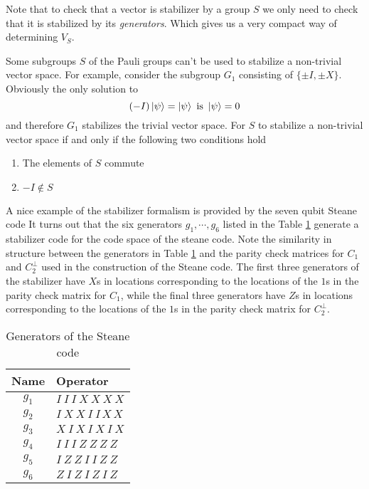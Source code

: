 \documentclass[11pt,a4paper]{article}
\theoremstyle{definition}
\theoremstyle{plain}
\theoremstyle{remark}
\begin{document}
Note that to check that a vector is stabilizer by a group $S$ we only need to check that 
it is stabilized by its \emph{generators}. Which gives us a very compact way of determining $V_S$. 

Some subgroups $S$ of the Pauli groups can't be used to stabilize a non-trivial vector space. 
For example, consider the subgroup $G_1$ consisting of $\{\pm I, \pm X\}$. Obviously the only solution to 
$$(-I) \ket{\psi} = \ket{\psi} \text{ is } \ket{\psi} = 0$$
and therefore $G_1$ stabilizes the trivial vector space. For $S$ to stabilize a 
non-trivial vector space if and only if the following two conditions hold
\begin{enumerate}[label = (\alph*)]
    \item The elements of $S$ commute
    \item $-I \not\in S$ 
\end{enumerate}

A nice example of the stabilizer formalism is provided by the seven qubit Steane code 
It turns out that the six generators $g_1, \cdots, g_6$ listed in the Table \ref{tab:generators-Steane} generate a stabilizer code for 
the code space of the steane code. Note the similarity in structure between the generators in Table \ref{tab:generators-Steane} and the 
parity check matrices for $C_1$ and $C_2^\perp$ used in the construction of the Steane code. 
The first three generators of the stabilizer have $X$s in locations corresponding to the locations of the $1$s in the parity 
check matrix for $ C_1$, while the final three generators have $Z$s in locations corresponding to the locations 
of the $1$s in the parity check matrix for $C_2^\perp$.  

\begin{table}[ht]
  \centering
  \begin{tabular}{@{} c l @{}}
    \toprule
    \textbf{Name} & \textbf{Operator} \\
    \midrule
    $g_1$ & $I\ I \ I \ X \ X\ X\ X$ \\
    $g_2$ & $I\ X\ X\ I\ I\,X\,X$ \\
    $g_3$ & $X\ I\ X\ I\ X\ I\ X$ \\
    $g_4$ & $I\ I\ I\ Z\ Z\ Z\ Z$ \\
    $g_5$ & $I\ Z\ Z\ I\ I\ Z\ Z$ \\
    $g_6$ & $Z\ I\ Z\ I\ Z\ I\ Z$ \\
    \bottomrule
  \end{tabular}
  \caption{Generators of the Steane code}\label{tab:generators-Steane}
\end{table}
\end{document}
